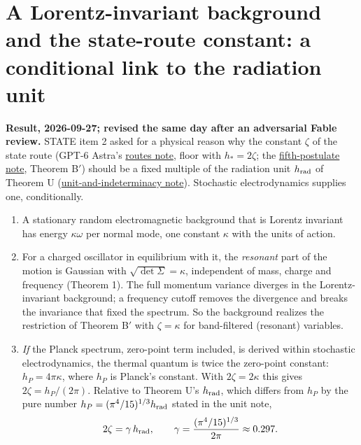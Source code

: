 \documentclass[11pt,a4paper]{article}
\newcommand{\tightlist}{\setlength{\itemsep}{0pt}\setlength{\parskip}{0pt}}
\begin{document}
\hypertarget{a-lorentz-invariant-background-and-the-state-route-constant-a-conditional-link-to-the-radiation-unit}{%
\section{A Lorentz-invariant background and the state-route constant: a
conditional link to the radiation
unit}\label{a-lorentz-invariant-background-and-the-state-route-constant-a-conditional-link-to-the-radiation-unit}}

\textbf{Result, 2026-09-27; revised the same day after an adversarial
Fable review.} STATE item 2 asked for a physical reason why the constant
\(\zeta\) of the state route (GPT-6 Astra's
\href{newton-indeterminacy-routes.md}{routes note}, floor with
\(h_*=2\zeta\); the \href{principia-fifth-postulate.md}{fifth-postulate
note}, Theorem B\('\)) should be a fixed multiple of the radiation unit
\(h_{\rm rad}\) of Theorem U
(\href{necessity-unit-and-indeterminacy.md}{unit-and-indeterminacy
note}). Stochastic electrodynamics supplies one, conditionally.

\begin{enumerate}
\def\labelenumi{\arabic{enumi}.}
\tightlist
\item
  A stationary random electromagnetic background that is Lorentz
  invariant has energy \(\kappa\omega\) per normal mode, one constant
  \(\kappa\) with the units of action.
\item
  For a charged oscillator in equilibrium with it, the \emph{resonant}
  part of the motion is Gaussian with \(\sqrt{\det\Sigma}=\kappa\),
  independent of mass, charge and frequency (Theorem 1). The full
  momentum variance diverges in the Lorentz-invariant background; a
  frequency cutoff removes the divergence and breaks the invariance that
  fixed the spectrum. So the background realizes the restriction of
  Theorem B\('\) with \(\zeta=\kappa\) for band-filtered (resonant)
  variables.
\item
  \emph{If} the Planck spectrum, zero-point term included, is derived
  within stochastic electrodynamics, the thermal quantum is twice the
  zero-point constant: \(h_P=4\pi\kappa\), where \(h_P\) is Planck's
  constant. With \(2\zeta=2\kappa\) this gives \(2\zeta=h_P/(2\pi)\).
  Relative to Theorem U's \(h_{\rm rad}\), which differs from \(h_P\) by
  the pure number \(h_P=(\pi^4/15)^{1/3}h_{\rm rad}\) stated in the unit
  note, \[2\zeta=\gamma\,h_{\rm rad},\qquad
  \gamma=\frac{(\pi^4/15)^{1/3}}{2\pi}\approx0.297 .\]
\end{enumerate}
\end{document}

